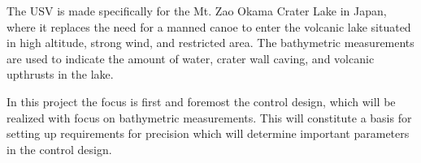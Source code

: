 The USV is made specifically for the Mt. Zao Okama Crater Lake in Japan, where it replaces the need for a manned canoe to enter the volcanic lake situated in high
altitude, strong wind, and restricted area. The bathymetric measurements are used to indicate the amount of water, crater wall caving, and volcanic upthrusts in the lake.\cite{AWatanabe}
%

In this project the focus is first and foremost the control design, which will be realized with focus on bathymetric measurements. This will constitute a basis for setting up requirements for precision which will determine important parameters in the control design.